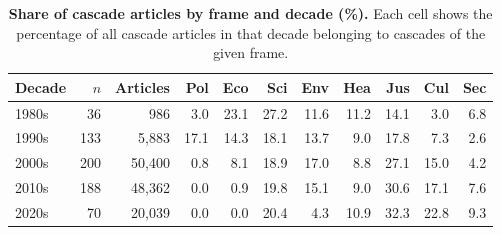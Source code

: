 \begin{table}[h]
\centering
\renewcommand{\arraystretch}{1.15}
\caption{\textbf{Share of cascade articles by frame and decade (\%).}
Each cell shows the percentage of all cascade articles in that decade
belonging to cascades of the given frame.}
\label{tab:si_cascade_share}
\vspace{0.3em}
\footnotesize
\begin{tabular}{@{}l r r r r r r r r r r @{}}
\toprule
Decade & $n$ & Articles & Pol & Eco & Sci & Env & Hea & Jus & Cul & Sec \\
\midrule
1980s & 36 & 986 & 3.0 & 23.1 & 27.2 & 11.6 & 11.2 & 14.1 & 3.0 & 6.8 \\
1990s & 133 & 5,883 & 17.1 & 14.3 & 18.1 & 13.7 & 9.0 & 17.8 & 7.3 & 2.6 \\
2000s & 200 & 50,400 & 0.8 & 8.1 & 18.9 & 17.0 & 8.8 & 27.1 & 15.0 & 4.2 \\
2010s & 188 & 48,362 & 0.0 & 0.9 & 19.8 & 15.1 & 9.0 & 30.6 & 17.1 & 7.6 \\
2020s & 70 & 20,039 & 0.0 & 0.0 & 20.4 & 4.3 & 10.9 & 32.3 & 22.8 & 9.3 \\
\bottomrule
\end{tabular}
\end{table}